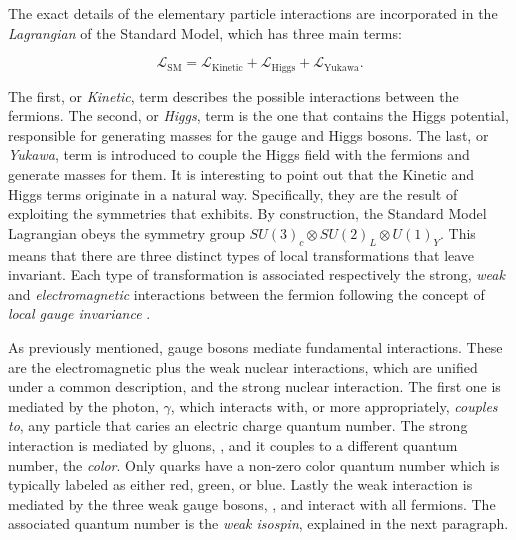 The exact details of the elementary particle interactions are incorporated in the
{\it Lagrangian} of the Standard Model, which has three main terms:

\begin{equation}
\mathscr{L}_{\text{SM}} =
\mathscr{L}_{\text{Kinetic}} + \mathscr{L}_{\text{Higgs}} + \mathscr{L}_{\text{Yukawa}}.
\label{lagrangian}
\end{equation}

\noindent The first, or {\it Kinetic}, term describes the possible interactions between the fermions.
The second, or {\it Higgs}, term is the one that contains the Higgs potential, responsible for generating
masses for the gauge and Higgs bosons. The last, or {\it Yukawa}, term is introduced to
couple the Higgs field with the fermions and generate masses for them.
It is interesting to point out that the Kinetic and Higgs terms originate in a natural way.
Specifically, they are the result of exploiting the symmetries that  exhibits.
By construction, the Standard Model Lagrangian obeys the symmetry group $SU(3)_c\otimes SU(2)_L\otimes U(1)_Y$.
This means that there are three distinct types of local transformations that leave  invariant.
Each type of transformation is associated respectively the strong, {\it weak} and {\it electromagnetic} interactions
between the fermion following the concept of {\it local gauge invariance} \cite{aitchison,halzen1984quarks}.

As previously mentioned, gauge bosons mediate fundamental interactions. These are the electromagnetic
plus the weak nuclear interactions, which are unified under a common description, and the strong nuclear interaction.
The first one is mediated by the photon, $\gamma$, which interacts with, or more appropriately, {\it couples to}, any particle that
caries an electric charge quantum number. The strong interaction is mediated by gluons, \gluon,
and it couples to a different quantum number, the  {\it color}.
Only quarks have a non-zero color quantum number which is typically labeled as either red, green, or blue. Lastly the
weak interaction is mediated by the three weak gauge bosons, \Wpm, \Z and interact with all fermions.
The associated quantum number is the  {\it weak isospin}, explained in the next paragraph.

